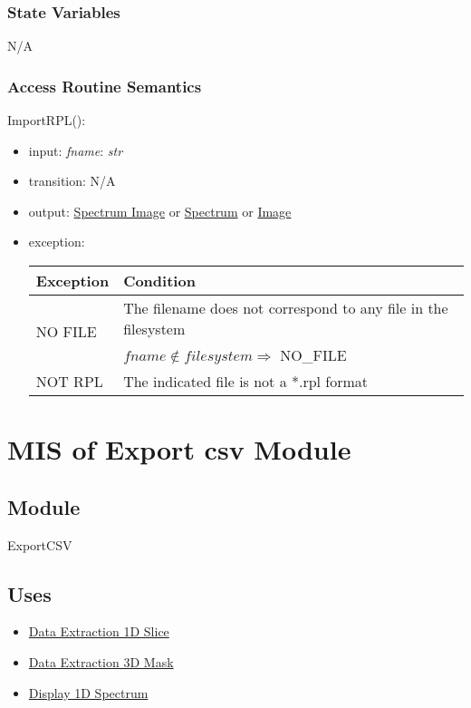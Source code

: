 \documentclass[12pt, titlepage]{article}
\begin{document}
\subsubsection{State Variables}
N/A

\subsubsection{Access Routine Semantics}

\noindent ImportRPL():
\begin{itemize}
    \item input: \textit{fname}: \textit{str}
    \item transition: N/A
    \item output: \hyperref[Mod:SI]{Spectrum Image} or \hyperref[Mod:Spectrum]{Spectrum} or \hyperref[Mod:Image]{Image}
    \item exception: 
    \begin{center}
        \begin{tabular}{p{3cm} p{12cm}}
            \toprule[0.15em]
            \textbf{Exception} & \textbf{Condition}\\
            \midrule[0.1em]
            \multirow{2}{0.25\textwidth}{NO FILE} & The filename does not correspond to any file in the filesystem\\ 
            & $fname \notin filesystem \Rightarrow$ NO\_FILE\\ 
            \midrule[0.05em]
            NOT RPL & The indicated file is not a *.rpl format\\
            \bottomrule[0.15em]
        \end{tabular}
    \end{center}
\end{itemize}

\section{MIS of Export csv Module} \label{Mod:ExportCSV}

\subsection{Module}

ExportCSV

\subsection{Uses}
\begin{itemize}
    \item \hyperref[Mod:Slice1D]{Data Extraction 1D Slice}
    \item \hyperref[Mod:Mask3D]{Data Extraction 3D Mask}
    \item \hyperref[Mod:Disp1D]{Display 1D Spectrum}
\end{itemize}
\end{document}
